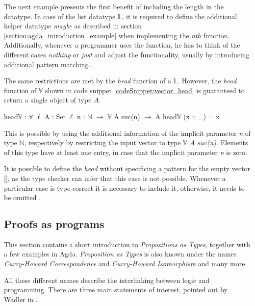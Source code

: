 The next example presents the first benefit of including the length in the datatype.
In case of the list datatype $\mathbb{L}$, it is required to define the additional helper datatype \emph{maybe} as described in section \ref{section:agda_introduction_example} when implementing the \emph{nth} function.
Additionally, whenever a programmer uses the function, he has to think of the different cases \emph{nothing} or \emph{just} and adjust the functionality, usually by introducing additional pattern matching. 

The same restrictions are met by the \emph{head} function of a $\mathbb{L}$. 
However, the \emph{head} function of $\mathbb{V}$ shown in code snippet \ref{codeSnippet:vector_head} is guaranteed to return a single object of type \emph{A}.

\begin{codesnippet}[mathescape=true, caption={Definition of $head\mathbb{V}$ function in Agda}, label={codeSnippet:vector_head}]
head$\mathbb{V}$ : $\forall$ {$\ell$} {A : Set $\ell$} {n : $\mathbb{N}$} $\rightarrow$ 
        $\mathbb{V}$ A suc(n) $\rightarrow$ A
head$\mathbb{V}$ (x :: _) = x
\end{codesnippet}

This is possible by using the additional information of the implicit parameter \emph{n} of type $\mathbb{N}$, respectively by restricting the input vector to type \emph{$\mathbb{V}$ A suc(n)}.
Elements of this type have at least one entry, in case that the implicit parameter \emph{n} is zero.

It is possible to define the \emph{head} without specificing a pattern for the empty vector [], as the type checker can infer that this case is not possible.
Whenever a particular case is type correct it is necessary to include it, otherwise, it needs to be omitted \cite{norell:deptyped}.

\subsection{Proofs as programs}\label{section:agda_proofs}
This section contains a short introduction to \emph{Propositions as Types}\cite{10.1145/2699407}, together with a few examples in Agda. 
\emph{Proposition as Types} is also known under the names \emph{Curry-Howard Correspondence}\cite{10.5555/1076265} and \emph{Curry-Howard Isomorphism}\cite{10.1145/2841316} and many more.

All these different names describe the interlinking between logic and programming.
There are three main statements of interest, pointed out by Wadler in \cite{10.1145/2699407}.

